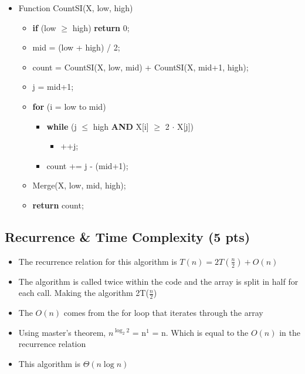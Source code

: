 \documentclass{article}[12pt]
\begin{document}
\begin{itemize}
  \item Function CountSI(X, low, high)
    \begin{itemize}
      \item \textbf{if} (low $\geq$ high) \textbf{return} 0;
      \item mid = (low + high) / 2;
      \item count = CountSI(X, low, mid) + CountSI(X, mid+1, high);
      \item j = mid+1;
      \item \textbf{for} (i = low to mid)
        \begin{itemize}
          \item \textbf{while} (j $\leq$ high \textbf{AND} X[i] $\geq$ 2 $\cdot$ X[j])
        \begin{itemize}
          \item ++j;
        \end{itemize}
          \item count += j - (mid+1);
        \end{itemize}
      \item Merge(X, low, mid, high);
      \item \textbf{return} count;
    \end{itemize}
\end{itemize}

\vspace*{10px}
\subsection{Recurrence \& Time Complexity (5 pts)}
\begin{itemize}
  \item The recurrence relation for this algorithm is $T(n) = 2T(\frac{n}{2}) + O(n)$
  \item The algorithm is called twice within the code and the 
    array is split in half for each call. Making the algorithm 
    2T($\frac{n}{2}$)
  \item The $O(n)$ comes from the for loop that iterates through the array
  \item Using master's theorem,
    $n^{\log_{2} 2}$ = n$^{1}$ = n.
    Which is equal to the $O(n)$ in the recurrence relation
  \item This algorithm is $\Theta(n \log n)$
\end{itemize}
\end{document}
